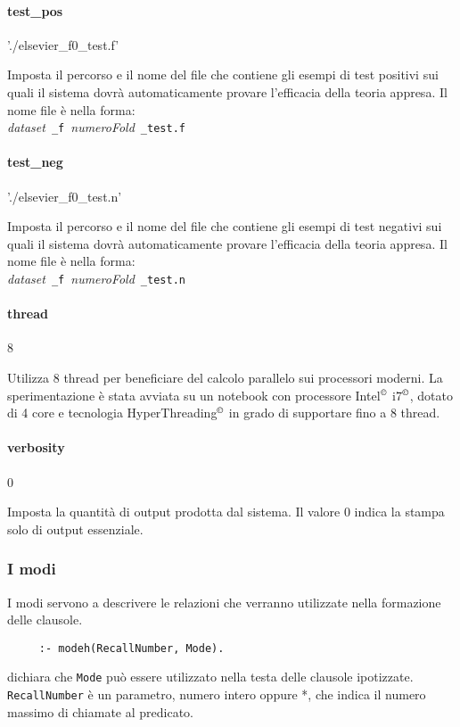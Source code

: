 \paragraph{test\_pos}   './elsevier\_f0\_test.f'

      Imposta il percorso e il nome del file che contiene gli esempi di test positivi sui quali il sistema dovrà automaticamente provare l'efficacia della teoria appresa. Il nome file è nella forma:\\ \emph{dataset}~\verb+_f+~\emph{numeroFold}~\verb+_test.f+

\paragraph{test\_neg}   './elsevier\_f0\_test.n'

      Imposta il percorso e il nome del file che contiene gli esempi di test negativi sui quali il sistema dovrà automaticamente provare l'efficacia della teoria appresa. Il nome file è nella forma:\\ \emph{dataset}~\verb+_f+~\emph{numeroFold}~\verb+_test.n+
      
\paragraph{thread}   8

   Utilizza 8 thread per beneficiare del calcolo parallelo sui processori moderni. La sperimentazione è stata avviata su un notebook con processore Intel$^{\scriptsize{\copyright{}}}$ i7$^{\scriptsize{\copyright{}}}$, dotato di 4 core e tecnologia HyperThreading$^{\scriptsize{\copyright{}}}$ in grado di supportare fino a 8 thread.
 
\paragraph{verbosity}   0

Imposta la quantità di output prodotta dal sistema. Il valore $0$ indica la stampa solo di output essenziale.

\subsubsection*{I modi}
I modi servono a descrivere le relazioni che verranno utilizzate nella formazione delle clausole.

\begin{verbatim}
     :- modeh(RecallNumber, Mode).
\end{verbatim}
dichiara che \verb+Mode+ può essere utilizzato nella testa delle clausole ipotizzate. \verb+RecallNumber+ è un parametro, numero intero oppure *, che indica il numero massimo di chiamate al predicato.

